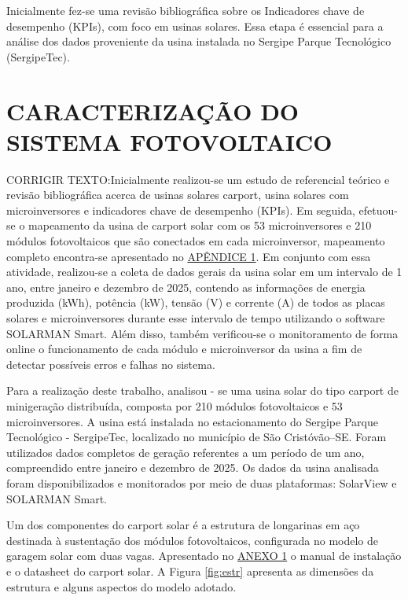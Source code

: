 Inicialmente fez-se uma revisão bibliográfica sobre os Indicadores chave de desempenho (KPIs), com foco em usinas solares. Essa etapa é essencial para a análise dos dados proveniente da usina instalada no Sergipe Parque Tecnológico (SergipeTec).



\section{CARACTERIZAÇÃO DO SISTEMA FOTOVOLTAICO}

CORRIGIR TEXTO:Inicialmente realizou-se um estudo de referencial teórico e revisão bibliográfica acerca de usinas solares carport, usina solares com microinversores e indicadores chave de desempenho (KPIs). Em seguida, efetuou-se o mapeamento da usina de carport solar com os 53 microinversores e 210 módulos fotovoltaicos que são conectados em cada microinversor, mapeamento completo encontra-se apresentado no \hyperref[ap:catalogacao-u]{APÊNDICE 1}. Em conjunto com essa atividade, realizou-se a coleta de dados gerais da usina solar em um intervalo de 1 ano, entre janeiro e dezembro de 2025, contendo as informações de energia produzida (kWh), potência (kW), tensão (V) e corrente (A) de todos as placas solares e microinversores durante esse intervalo de tempo utilizando o software SOLARMAN Smart. Além disso, também verificou-se o monitoramento de forma online o funcionamento de cada módulo e microinversor da usina a fim de detectar possíveis erros e falhas no sistema.




Para a realização deste trabalho, analisou - se uma usina solar do tipo carport de minigeração distribuída, composta por 210 módulos fotovoltaicos e 53 microinversores. A usina está instalada no estacionamento do Sergipe Parque Tecnológico - SergipeTec, localizado no município de São Cristóvão–SE. Foram utilizados dados completos de geração referentes a um período de um ano, compreendido entre janeiro e dezembro de 2025. Os dados da usina analisada foram disponibilizados e monitorados por meio de duas plataformas: SolarView e SOLARMAN Smart.

Um dos componentes do carport solar é a estrutura de longarinas em aço destinada à sustentação dos módulos fotovoltaicos, configurada no modelo de garagem solar com duas vagas. Apresentado no \hyperref[ap:datasheet-carport]{ANEXO 1}
 o manual de instalação e o datasheet do carport solar. A Figura \ref{fig:estr} apresenta as dimensões da estrutura e alguns aspectos do modelo adotado. 


